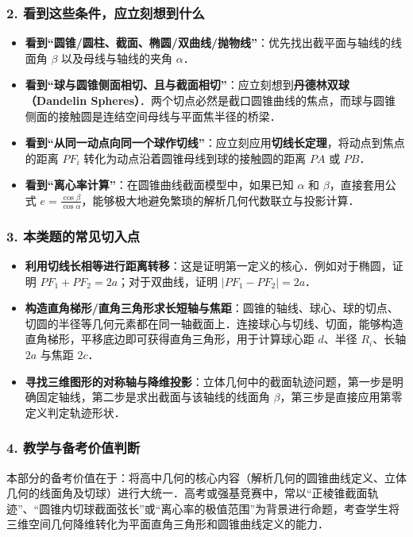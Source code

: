 \documentclass[11pt,a4paper]{ctexart}
\begin{document}
\subsubsection*{2. 看到这些条件，应立刻想到什么}
\begin{itemize}[itemsep=0.3em]
  \item \textbf{看到“圆锥/圆柱、截面、椭圆/双曲线/抛物线”}：优先找出截平面与轴线的线面角 $\beta$ 以及母线与轴线的夹角 $\alpha$．
  \item \textbf{看到“球与圆锥侧面相切、且与截面相切”}：应立刻想到\textbf{丹德林双球（Dandelin Spheres）}．两个切点必然是截口圆锥曲线的焦点，而球与圆锥侧面的接触圆是连结空间母线与平面焦半径的桥梁．
  \item \textbf{看到“从同一动点向同一个球作切线”}：应立刻应用\textbf{切线长定理}，将动点到焦点的距离 $PF_i$ 转化为动点沿着圆锥母线到球的接触圆的距离 $PA$ 或 $PB$．
  \item \textbf{看到“离心率计算”}：在圆锥曲线截面模型中，如果已知 $\alpha$ 和 $\beta$，直接套用公式 $e = \frac{\cos\beta}{\cos\alpha}$，能够极大地避免繁琐的解析几何代数联立与投影计算．
\end{itemize}

\subsubsection*{3. 本类题的常见切入点}
\begin{itemize}[itemsep=0.3em]
  \item \textbf{利用切线长相等进行距离转移}：这是证明第一定义的核心．例如对于椭圆，证明 $PF_1 + PF_2 = 2a$；对于双曲线，证明 $|PF_1 - PF_2| = 2a$．
  \item \textbf{构造直角梯形/直角三角形求长短轴与焦距}：圆锥的轴线、球心、球的切点、切圆的半径等几何元素都在同一轴截面上．连接球心与切线、切面，能够构造直角梯形，平移底边即可获得直角三角形，用于计算球心距 $d$、半径 $R_i$、长轴 $2a$ 与焦距 $2c$．
  \item \textbf{寻找三维图形的对称轴与降维投影}：立体几何中的截面轨迹问题，第一步是明确固定轴线，第二步是求出截面与该轴线的线面角 $\beta$，第三步是直接应用第零定义判定轨迹形状．
\end{itemize}

\subsubsection*{4. 教学与备考价值判断}
本部分的备考价值在于：将高中几何的核心内容（解析几何的圆锥曲线定义、立体几何的线面角及切球）进行大统一．高考或强基竞赛中，常以“正棱锥截面轨迹”、“圆锥内切球截面弦长”或“离心率的极值范围”为背景进行命题，考查学生将三维空间几何降维转化为平面直角三角形和圆锥曲线定义的能力．
\end{document}
